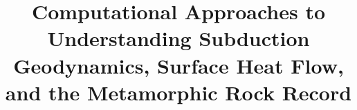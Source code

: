 \usepackage[noprefix,intoc]{nomencl}
  \makenomenclature
  



  \title{Computational Approaches to Understanding Subduction Geodynamics, Surface Heat Flow, and the Metamorphic Rock Record}

\renewcommand{\contentsname}{Table of contents}

\def\maketitle{
  \cleardoublepage
  \begin{titlepage}
    \pagenumbering{roman}
    \begin{center}
        {\huge Computational Approaches to Understanding Subduction Geodynamics, Surface Heat Flow, and the Metamorphic Rock Record \par}
        \vspace*{0.5in}

        {by\\}
        {Buchanan C. Kerswell}
        \vspace*{1in}

        A dissertation\\
        submitted in partial fulfillment \\
        of the requirements for the degree of\\
        Doctor of Philosophy~in~Geosciences\\
        Boise State University
        \vspace*{0.5in}

        November 2021
    \end{center}
  \end{titlepage}
  \let\maketitle\relax
}

